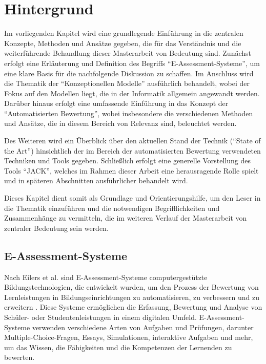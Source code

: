 \chapter{Hintergrund}

Im vorliegenden Kapitel wird eine grundlegende Einführung in die zentralen Konzepte, Methoden und Ansätze gegeben, die für das Verständnis und die weiterführende Behandlung dieser Masterarbeit von Bedeutung sind. Zunächst erfolgt eine Erläuterung und Definition des Begriffs ``E-Assessment-Systeme'', um eine klare Basis für die nachfolgende Diskussion zu schaffen. Im Anschluss wird die Thematik der ``Konzeptionellen Modelle'' ausführlich behandelt, wobei der Fokus auf den Modellen liegt, die in der Informatik allgemein angewandt werden. Darüber hinaus erfolgt eine umfassende Einführung in das Konzept der ``Automatisierten Bewertung'', wobei insbesondere die verschiedenen Methoden und Ansätze, die in diesem Bereich von Relevanz sind, beleuchtet werden.

Des Weiteren wird ein Überblick über den aktuellen Stand der Technik (``State of the Art'') hinsichtlich der im Bereich der automatisierten Bewertung verwendeten Techniken und Tools gegeben. Schließlich erfolgt eine generelle Vorstellung des Tools ``JACK'', welches im Rahmen dieser Arbeit eine herausragende Rolle spielt und in späteren Abschnitten ausführlicher behandelt wird.

Dieses Kapitel dient somit als Grundlage und Orientierungshilfe, um den Leser in die Thematik einzuführen und die notwendigen Begrifflichkeiten und Zusammenhänge zu vermitteln, die im weiteren Verlauf der Masterarbeit von zentraler Bedeutung sein werden.

\section{E-Assessment-Systeme}
    Nach Eilers et al. sind E-Assessment-Systeme computergestützte Bildungstechnologien, die entwickelt wurden, um den Prozess der Bewertung von Lernleistungen in Bildungseinrichtungen zu automatisieren, zu verbessern und zu erweitern \cite{eilers2008konzeption}. Diese Systeme ermöglichen die Erfassung, Bewertung und Analyse von Schüler- oder Studentenleistungen in einem digitalen Umfeld. E-Assessment-Systeme verwenden verschiedene Arten von Aufgaben und Prüfungen, darunter Multiple-Choice-Fragen, Essays, Simulationen, interaktive Aufgaben und mehr, um das Wissen, die Fähigkeiten und die Kompetenzen der Lernenden zu bewerten.
    
